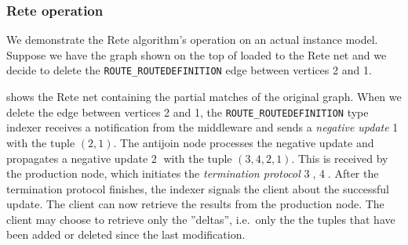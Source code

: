 % 




% 


\subsubsection{Rete operation}

We demonstrate the Rete algorithm's operation on an actual instance model. Suppose we have the graph shown on the top of  loaded to the Rete net and we decide to delete the \texttt{ROUTE\_ROUTEDEFINITION} edge between vertices 2 and 1.


 shows the Rete net containing the partial matches of the original graph. When we delete the edge between vertices 2 and 1, the \texttt{ROUTE\_ROUTEDEFINITION} type indexer receives a notification from the middleware and sends a \textit{negative update} \textcircled{1} with the tuple $(2, 1)$. The antijoin node processes the negative update and propagates a negative update \textcircled{2} with the tuple $(3, 4, 2, 1)$. This is received by the production node, which initiates the \textit{termination protocol} \textcircled{3}, \textcircled{4}. After the termination protocol finishes, the indexer signals the client about the successful update. The client can now retrieve the results from the production node. The client may choose to retrieve only the ''deltas'', i.e.\ only the the tuples that have been added or deleted since the last modification.


